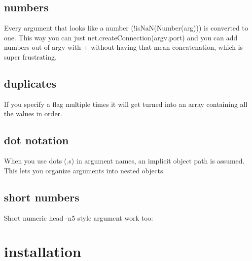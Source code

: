 \subsection*{numbers }

Every argument that looks like a number ({\ttfamily !is\+NaN(Number(arg))}) is converted to one. This way you can just {\ttfamily net.\+create\+Connection(argv.\+port)} and you can add numbers out of {\ttfamily argv} with {\ttfamily +} without having that mean concatenation, which is super frustrating.

\subsection*{duplicates }

If you specify a flag multiple times it will get turned into an array containing all the values in order. 


\subsection*{dot notation }

When you use dots ({\ttfamily .}s) in argument names, an implicit object path is assumed. This lets you organize arguments into nested objects. 


\subsection*{short numbers }

Short numeric {\ttfamily head -\/n5} style argument work too\+: 


\section*{installation }

